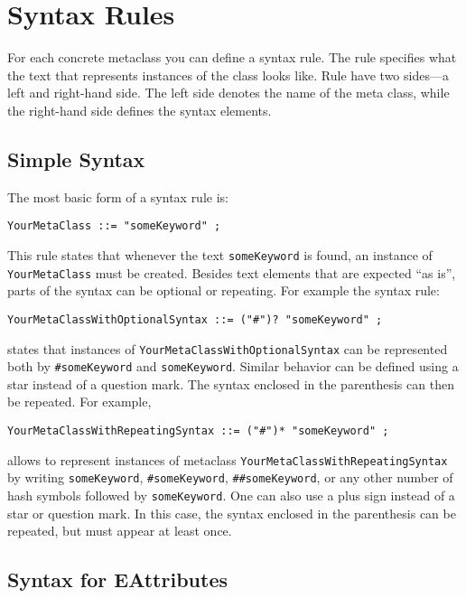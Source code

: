 \section{Syntax Rules}

For each concrete metaclass you can define a syntax rule. The rule specifies
what the text that represents instances of the class looks like. Rule have two
sides---a left and right-hand side. The left side denotes the name of the meta
class, while the right-hand side defines the syntax elements.

\subsection{Simple Syntax}

The most basic form of a syntax rule is:

\begin{lstlisting}
YourMetaClass ::= "someKeyword" ;
\end{lstlisting}

This rule states that whenever the text \texttt{someKeyword} is found, an
instance of \texttt{YourMetaClass} must be created. Besides text elements that are
expected ``as is'', parts of the syntax can be optional or repeating. For
example the syntax rule:

\begin{lstlisting}
YourMetaClassWithOptionalSyntax ::= ("#")? "someKeyword" ;
\end{lstlisting}

states that instances of \texttt{YourMetaClassWithOptionalSyntax} can be
represented both by \texttt{\#someKeyword} and \texttt{someKeyword}. Similar
behavior can be defined using a star instead of a question mark. The syntax 
enclosed in the parenthesis can then be repeated. For example,

\begin{lstlisting}
YourMetaClassWithRepeatingSyntax ::= ("#")* "someKeyword" ;
\end{lstlisting}

allows to represent instances of metaclass
\texttt{YourMetaClassWithRepeatingSyntax} by writing \texttt{someKeyword},
\texttt{\#someKeyword}, \texttt{\#\#someKeyword}, or any other number of hash
symbols followed by \texttt{someKeyword}.
One can also use a plus sign instead of a star or question mark. In this case,
the syntax enclosed in the parenthesis can be repeated, but must appear at least
once.

\subsection{Syntax for EAttributes}

